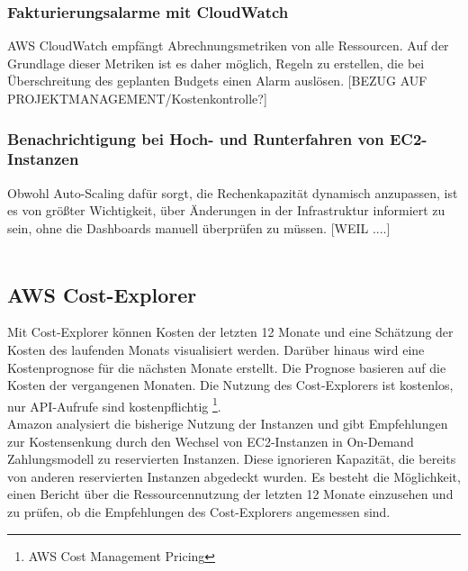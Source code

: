 \subsubsection*{Fakturierungsalarme mit CloudWatch}
AWS CloudWatch empfängt Abrechnungsmetriken von alle Ressourcen. Auf der Grundlage dieser Metriken ist es daher möglich, Regeln zu erstellen, die bei Überschreitung des geplanten Budgets einen Alarm auslösen.
[BEZUG AUF PROJEKTMANAGEMENT/Kostenkontrolle?]

\subsubsection*{Benachrichtigung bei Hoch- und Runterfahren von EC2-Instanzen}
Obwohl Auto-Scaling dafür sorgt, die Rechenkapazität dynamisch anzupassen, ist es von größter Wichtigkeit, über Änderungen in der Infrastruktur informiert zu sein, ohne die Dashboards manuell überprüfen zu müssen.
[WEIL ....]
\\\\
\subsection{AWS Cost-Explorer}
Mit Cost-Explorer können Kosten der letzten 12 Monate und eine Schätzung der Kosten des laufenden Monats visualisiert werden. Darüber hinaus wird eine Kostenprognose für die nächsten Monate erstellt. Die Prognose basieren auf die Kosten der vergangenen Monaten. Die Nutzung des Cost-Explorers ist kostenlos, nur API-Aufrufe sind kostenpflichtig \footnote{{\cite{AMZ22}AWS Cost Management Pricing}}.
\\
Amazon analysiert die bisherige Nutzung der Instanzen und gibt Empfehlungen zur Kostensenkung durch den Wechsel von EC2-Instanzen in On-Demand Zahlungsmodell zu reservierten Instanzen. Diese ignorieren Kapazität, die bereits von anderen reservierten Instanzen abgedeckt wurden.
Es besteht die Möglichkeit, einen Bericht über die Ressourcennutzung der letzten 12 Monate einzusehen und zu prüfen, ob die Empfehlungen des Cost-Explorers angemessen sind.

